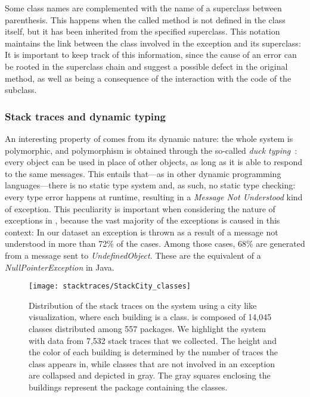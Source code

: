 Some class names are complemented with the name of a superclass between parenthesis.
This happens when the called method is not defined in the class itself, but it has been inherited from the specified superclass.
This notation maintains the link between the class involved in the exception and its superclass: It is important to keep track of this information, since the cause of an error can be rooted in the superclass chain and suggest a possible defect in the original method, as well as being a consequence of the interaction with the code of the subclass.

\subsubsection{Stack traces and dynamic typing}

An interesting property of \pha comes from its dynamic nature: the whole system is polymorphic, and polymorphism is obtained through the so-called \emph{duck typing}~\cite{Chugh2012}: every object can be used in place of other objects, as long as it is able to respond to the same messages.
This entails that---as in other dynamic programming languages---there is no static type system and, as such, no static type checking: every type error happens at runtime, resulting in a \emph{Message Not Understood} kind of exception.
This peculiarity is important when considering the nature of exceptions in \pha, because the vast majority of the exceptions is caused in this context: In our dataset an exception is thrown as a result of a message not understood in more than 72\% of the cases.
Among those cases, 68\% are generated from a message sent to \emph{UndefinedObject}.
These are the equivalent of a \emph{NullPointerException} in Java.

\begin{figure*}[ht]
\begin{center}
  \texttt{[image: stacktraces/StackCity\_classes]}
  \caption{Distribution of the stack traces on the \pha system using a city like visualization, where each building is a class.
\pha is composed of 14,045 classes distributed among 557 packages.
We highlight the system with data from 7,532 stack traces that we collected.
The height and the color of each building is determined by the number of traces the class appears in, while classes that are not involved in an exception are collapsed and depicted in gray.
The gray squares enclosing the buildings represent the package containing the classes.}
  \label{fig:stackcity-classes}
\end{center}
\end{figure*}

